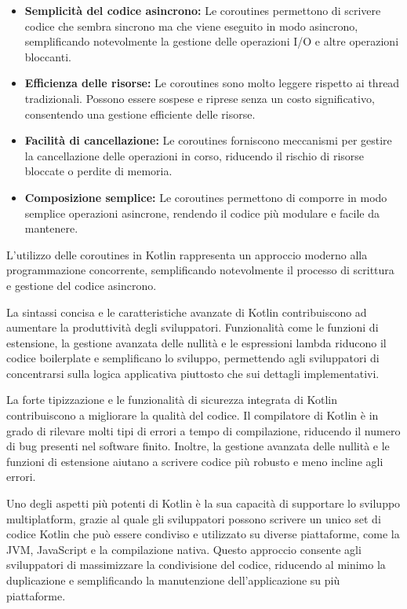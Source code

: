 \documentclass[12pt,a4paper,openright,twoside]{book}
\begin{document}
\begin{itemize}
    \item \textbf{Semplicità del codice asincrono:} Le coroutines permettono di scrivere codice che sembra sincrono ma che viene eseguito in modo asincrono, 
    semplificando notevolmente la gestione delle operazioni I/O e altre operazioni bloccanti.
    \item \textbf{Efficienza delle risorse:} Le coroutines sono molto leggere rispetto ai thread tradizionali. Possono essere sospese e riprese senza un costo significativo, 
    consentendo una gestione efficiente delle risorse.
    \item \textbf{Facilità di cancellazione:} Le coroutines forniscono meccanismi per gestire la cancellazione delle operazioni in corso, 
    riducendo il rischio di risorse bloccate o perdite di memoria.
    \item \textbf{Composizione semplice:} Le coroutines permettono di comporre in modo semplice operazioni asincrone, rendendo il codice più modulare e facile da mantenere.
\end{itemize}

L'utilizzo delle coroutines in Kotlin rappresenta un approccio moderno alla programmazione concorrente, 
semplificando notevolmente il processo di scrittura e gestione del codice asincrono.

La sintassi concisa e le caratteristiche avanzate di Kotlin contribuiscono ad aumentare la produttività degli sviluppatori. 
Funzionalità come le funzioni di estensione, la gestione avanzata delle nullità e le espressioni lambda riducono il codice boilerplate e semplificano lo sviluppo, 
permettendo agli sviluppatori di concentrarsi sulla logica applicativa piuttosto che sui dettagli implementativi.

La forte tipizzazione e le funzionalità di sicurezza integrata di Kotlin contribuiscono a migliorare la qualità del codice. 
Il compilatore di Kotlin è in grado di rilevare molti tipi di errori a tempo di compilazione, riducendo il numero di bug presenti nel software finito. Inoltre, 
la gestione avanzata delle nullità e le funzioni di estensione aiutano a scrivere codice più robusto e meno incline agli errori.

Uno degli aspetti più potenti di Kotlin è la sua capacità di supportare lo sviluppo multiplatform, grazie al quale gli sviluppatori possono scrivere 
un unico set di codice Kotlin che può essere condiviso e utilizzato su diverse piattaforme, come la \ac{JVM}, JavaScript e la compilazione nativa. 
Questo approccio consente agli sviluppatori di massimizzare la condivisione del codice, riducendo al minimo la duplicazione e semplificando la manutenzione dell'applicazione 
su più piattaforme.
\end{document}
